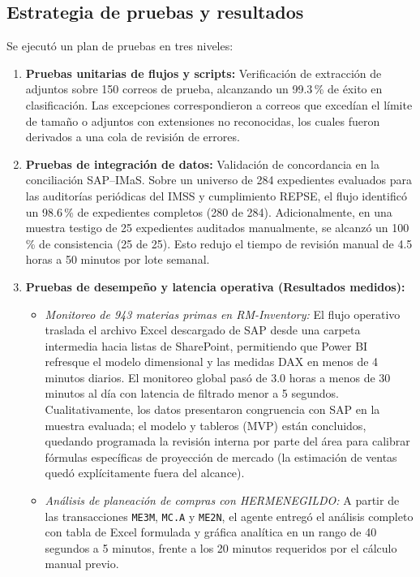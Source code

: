 \subsection{Estrategia de pruebas y resultados}

Se ejecutó un plan de pruebas en tres niveles:
\begin{enumerate}
    \item \textbf{Pruebas unitarias de flujos y scripts:} Verificación de extracción de adjuntos sobre 150 correos de prueba, alcanzando un 99.3\,\% de éxito en clasificación. Las excepciones correspondieron a correos que excedían el límite de tamaño o adjuntos con extensiones no reconocidas, los cuales fueron derivados a una cola de revisión de errores.
    \item \textbf{Pruebas de integración de datos:} Validación de concordancia en la conciliación SAP--IMaS. Sobre un universo de 284 expedientes evaluados para las auditorías periódicas del IMSS y cumplimiento REPSE, el flujo identificó un 98.6\,\% de expedientes completos (280 de 284). Adicionalmente, en una muestra testigo de 25 expedientes auditados manualmente, se alcanzó un 100\,\% de consistencia (25 de 25). Esto redujo el tiempo de revisión manual de 4.5 horas a 50 minutos por lote semanal.
    \item \textbf{Pruebas de desempeño y latencia operativa (Resultados medidos):} 
    \begin{itemize}
        \item \emph{Monitoreo de 943 materias primas en RM-Inventory:} El flujo operativo traslada el archivo Excel descargado de SAP desde una carpeta intermedia hacia listas de SharePoint, permitiendo que Power BI refresque el modelo dimensional y las medidas DAX en menos de 4 minutos diarios. El monitoreo global pasó de 3.0 horas a menos de 30 minutos al día con latencia de filtrado menor a 5 segundos. Cualitativamente, los datos presentaron congruencia con SAP en la muestra evaluada; el modelo y tableros (MVP) están concluidos, quedando programada la revisión interna por parte del área para calibrar fórmulas específicas de proyección de mercado (la estimación de ventas quedó explícitamente fuera del alcance).
        \item \emph{Análisis de planeación de compras con HERMENEGILDO:} A partir de las transacciones \texttt{ME3M}, \texttt{MC.A} y \texttt{ME2N}, el agente entregó el análisis completo con tabla de Excel formulada y gráfica analítica en un rango de 40 segundos a 5 minutos, frente a los 20 minutos requeridos por el cálculo manual previo.

\end{itemize}
\end{enumerate}

